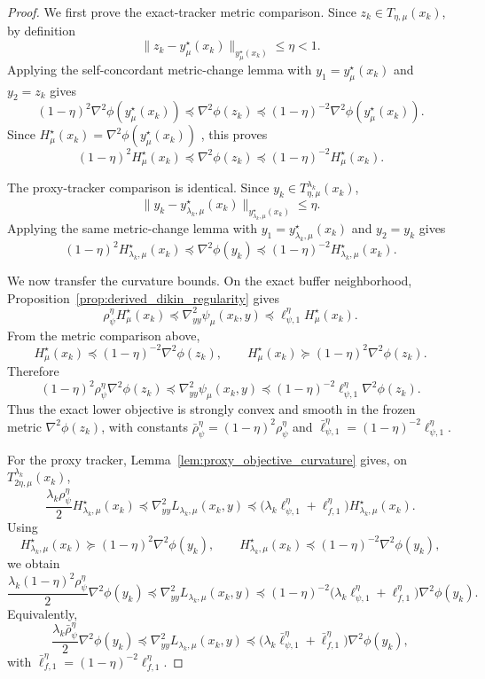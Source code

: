 \documentclass{article}
\begin{document}
\begin{proof}
We first prove the exact-tracker metric comparison. Since
\(z_k\in T_{\eta,\mu}(x_k)\), by definition
\[
\|z_k-y_\mu^\star(x_k)\|_{y_\mu^\star(x_k)}\le \eta < 1.
\]
Applying the self-concordant metric-change lemma with
\(y_1=y_\mu^\star(x_k)\) and \(y_2=z_k\) gives
\[
(1-\eta)^2\nabla^2\phi(y_\mu^\star(x_k))
\preceq
\nabla^2\phi(z_k)
\preceq
(1-\eta)^{-2}\nabla^2\phi(y_\mu^\star(x_k)).
\]
Since \(H_\mu^\star(x_k)=\nabla^2\phi(y_\mu^\star(x_k))\)
, this proves
\[
(1-\eta)^2H_\mu^\star(x_k)
\preceq
\nabla^2\phi(z_k)
\preceq
(1-\eta)^{-2}H_\mu^\star(x_k).
\]

The proxy-tracker comparison is identical. Since
\(y_k\in T_{\eta,\mu}^{\lambda_k}(x_k)\),
\[
\|y_k-y_{\lambda_k,\mu}^\star(x_k)\|_{y_{\lambda_k,\mu}^\star(x_k)}
\le \eta .
\]
Applying the same metric-change lemma with
\(y_1=y_{\lambda_k,\mu}^\star(x_k)\) and \(y_2=y_k\) gives
\[
(1-\eta)^2H_{\lambda_k,\mu}^\star(x_k)
\preceq
\nabla^2\phi(y_k)
\preceq
(1-\eta)^{-2}H_{\lambda_k,\mu}^\star(x_k).
\]

We now transfer the curvature bounds. On the exact buffer neighborhood,
Proposition~\ref{prop:derived_dikin_regularity} gives
\[
\rho_\psi^\eta H_\mu^\star(x_k)
\preceq
\nabla_{yy}^2\psi_\mu(x_k,y)
\preceq
\ell_{\psi,1}^\eta H_\mu^\star(x_k).
\]
From the metric comparison above,
\[
H_\mu^\star(x_k)
\preceq
(1-\eta)^{-2}\nabla^2\phi(z_k),
\qquad
H_\mu^\star(x_k)
\succeq
(1-\eta)^2\nabla^2\phi(z_k).
\]
Therefore
\[
(1-\eta)^2\rho_\psi^\eta \nabla^2\phi(z_k)
\preceq
\nabla_{yy}^2\psi_\mu(x_k,y)
\preceq
(1-\eta)^{-2}\ell_{\psi,1}^\eta \nabla^2\phi(z_k).
\]
Thus the exact lower objective is strongly convex and smooth in the frozen metric \(\nabla^2\phi(z_k)\), with
constants \(\bar\rho_\psi^\eta=(1-\eta)^2\rho_\psi^\eta\) and
\(\bar\ell_{\psi,1}^\eta=(1-\eta)^{-2}\ell_{\psi,1}^\eta\).

For the proxy tracker, Lemma~\ref{lem:proxy_objective_curvature} gives, on
\(T_{2\eta,\mu}^{\lambda_k}(x_k)\),
\[
\frac{\lambda_k\rho_\psi^\eta}{2}H_{\lambda_k,\mu}^\star(x_k)
\preceq
\nabla_{yy}^2L_{\lambda_k,\mu}(x_k,y)
\preceq
\bigl(\lambda_k\ell_{\psi,1}^\eta+\ell_{f,1}^\eta\bigr)
H_{\lambda_k,\mu}^\star(x_k).
\]
Using
\[
H_{\lambda_k,\mu}^\star(x_k)
\succeq
(1-\eta)^2\nabla^2\phi(y_k),
\qquad
H_{\lambda_k,\mu}^\star(x_k)
\preceq
(1-\eta)^{-2}\nabla^2\phi(y_k),
\]
we obtain
\[
\frac{\lambda_k(1-\eta)^2\rho_\psi^\eta}{2}\nabla^2\phi(y_k)
\preceq
\nabla_{yy}^2L_{\lambda_k,\mu}(x_k,y)
\preceq
(1-\eta)^{-2}
\bigl(\lambda_k\ell_{\psi,1}^\eta+\ell_{f,1}^\eta\bigr)\nabla^2\phi(y_k).
\]
Equivalently,
\[
\frac{\lambda_k\bar\rho_\psi^\eta}{2}\nabla^2\phi(y_k)
\preceq
\nabla_{yy}^2L_{\lambda_k,\mu}(x_k,y)
\preceq
\bigl(\lambda_k\bar\ell_{\psi,1}^\eta+\bar\ell_{f,1}^\eta\bigr)\nabla^2\phi(y_k),
\]
with
\(\bar\ell_{f,1}^\eta=(1-\eta)^{-2}\ell_{f,1}^\eta\).


\end{proof}
\end{document}
